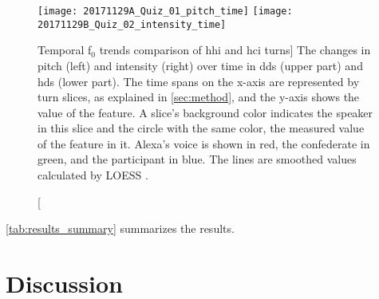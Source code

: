 \begin{figure}[t]
	\centering
	\subfigure
	{\texttt{[image: 20171129A\_Quiz\_01\_pitch\_time]}
		\label{fig:hds_dds_time_pitch}} 
	\hfill %
	{\texttt{[image: 20171129B\_Quiz\_02\_intensity\_time]}
		\label{fig:hds_dds_time_intensity}}
	\caption
	[Temporal f$_0$ trends comparison of \acs{hhi} and \acs{hci} turns]
	{The changes in pitch (left) and intensity (right) over time in \ac{dds} (upper part) and \ac{hds} (lower part).
		The time spans on the x-axis are represented by turn slices, as explained in \cref{sec:method}, and the y-axis shows the value of the feature.
		A slice's background color indicates the speaker in this slice and the circle with the same color, the measured value of the feature in it.
		Alexa's voice is shown in red, the confederate in green, and the participant in blue.
		The lines are smoothed values calculated by LOESS \citep{Cleveland1988locally}.}
	\label{fig:hds_dds_time_comparisons}
\end{figure}

\cref{tab:results_summary} summarizes the results.

\section{Discussion}
\label{sec:discussion}

